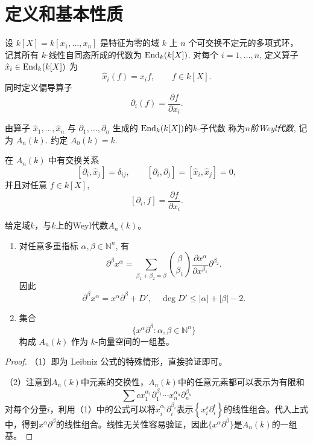 \documentclass[12pt,a4paper]{ctexrep}   %
\begin{document}
\section{定义和基本性质}
设 $k[X]=k[x_1,\dots,x_n]$ 是特征为零的域 $k$ 上
$n$ 个可交换不定元的多项式环，
记其所有 $k$-线性自同态所成的代数为 $\operatorname{End}_k(k[X])$.
对每个 $i=1,\dots,n$,
定义算子 $\hat{x}_i\in \operatorname{End}_k(k[X])$ 为
\[
    \hat{x}_i(f)=x_i f, \qquad f\in k[X].
\]
同时定义偏导算子
\[
    \partial_i(f)=\frac{\partial f}{\partial x_i}.
\]
\begin{definition}
    由算子 $\hat{x}_1,\dots,\hat{x}_n$ 与
    $\partial_1,\dots,\partial_n$
    生成的 $\operatorname{End}_k(k[X])$的$k$-子代数
    称为\emph{$n$阶Weyl代数},
    记为 $A_n(k)$.
    约定 $A_0(k)=k$.
\end{definition}



\begin{proposition}
    在 $A_n(k)$ 中有交换关系
    \[
        [\partial_i,\hat{x}_j]=\delta_{ij}, \qquad
    [\partial_i,\partial_j]=[\hat{x}_i,\hat{x}_j]=0,
    \]
    并且对任意 $f\in k[X]$,
    \[
        [\partial_i,f]=\frac{\partial f}{\partial x_i}.
    \]
\end{proposition}

\begin{proposition}\label{prop:weyl-basis}
    给定域$k$，与$k$上的Weyl代数$A_n(k)$。
    \begin{enumerate}
        \item 对任意多重指标 $\alpha,\beta\in\mathbb{N}^n$,
              有
              \[
                  \partial^\beta x^\alpha
                  =
                  \sum_{\beta_1+\beta_2=\beta}
                  \binom{\beta}{\beta_1}
                  \frac{\partial x^\alpha}{\partial x^{\beta_1}}
                  \partial^{\beta_2}.
              \]
              因此
              \[
                  \partial^\beta x^\alpha
                  =
                  x^\alpha\partial^\beta+D',
                  \quad
                  \deg D'\le |\alpha|+|\beta|-2.
              \]

        \item 集合
              \[
                  \{x^\alpha\partial^\beta:
                  \alpha,\beta\in\mathbb{N}^n\}
              \]
              构成 $A_n(k)$ 作为 $k$-向量空间的一组基。
    \end{enumerate}
    \begin{proof}
        （1）即为 Leibniz 公式的特殊情形，直接验证即可。

        （2）注意到$A_n(k)$中元素的交换性，$A_n(k)$中的任意元素都可以表示为有限和
        \begin{equation*}
            \sum c x_1^{\alpha_1}\partial_1^{\beta_1}\cdots x_n^{\alpha_n}\partial_n^{\beta_n}
        \end{equation*}
        对每个分量$i$，利用（1）中的公式可以将$x_i^{\alpha_i}\partial_i^{\beta_i}$表示$\left\{x_i^s\partial_i^t\right\}$的线性组合。代入上式 中，得到$x^\alpha\partial^\beta$的线性组合。线性无关性容易验证，因此$\{x^\alpha\partial^\beta\}$是$A_n(k)$的一组基。
    \end{proof}
\end{proposition}
\end{document}
